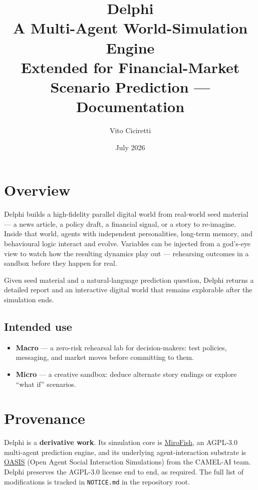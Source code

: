 \documentclass[11pt,a4paper]{article}
\title{\textbf{Delphi}\\[4pt] \large A Multi-Agent World-Simulation Engine \\[2pt] \normalsize Extended for Financial-Market Scenario Prediction --- Documentation}
\author{Vito Ciciretti}
\date{July 2026}
\begin{document}
\maketitle
\tableofcontents

\section{Overview}

Delphi builds a high-fidelity parallel digital world from real-world seed
material --- a news article, a policy draft, a financial signal, or a story to
re-imagine. Inside that world, agents with independent personalities, long-term
memory, and behavioural logic interact and evolve. Variables can be injected
from a god's-eye view to watch how the resulting dynamics play out --- rehearsing
outcomes in a sandbox before they happen for real.

Given seed material and a natural-language prediction question, Delphi returns a
detailed report and an interactive digital world that remains explorable after
the simulation ends.

\subsection{Intended use}

\begin{itemize}[nosep]
  \item \textbf{Macro} --- a zero-risk rehearsal lab for decision-makers: test
    policies, messaging, and market moves before committing to them.
  \item \textbf{Micro} --- a creative sandbox: deduce alternate story endings or
    explore ``what if'' scenarios.
\end{itemize}

\section{Provenance}
\label{sec:provenance}

Delphi is a \textbf{derivative work}. Its simulation core is
\href{https://github.com/666ghj/MiroFish}{MiroFish}, an AGPL-3.0 multi-agent
prediction engine, and its underlying agent-interaction substrate is
\href{https://github.com/camel-ai/oasis}{OASIS} (Open Agent Social Interaction
Simulations) from the CAMEL-AI team. Delphi preserves the AGPL-3.0 license end
to end, as required. The full list of modifications is tracked in
\texttt{NOTICE.md} in the repository root.
\end{document}
